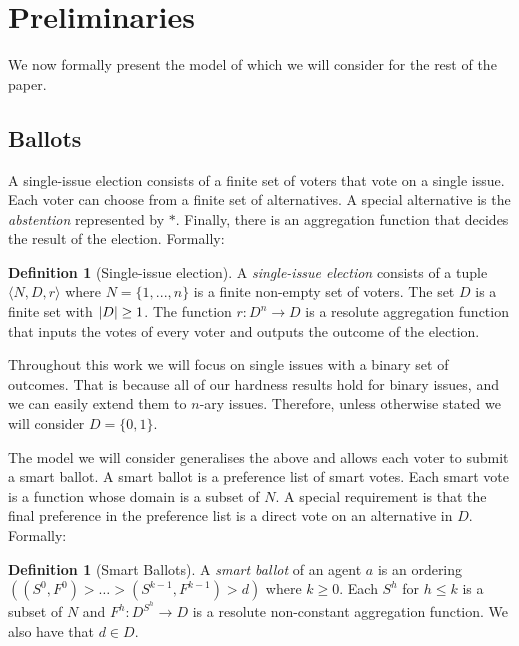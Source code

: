\documentclass[11pt,a4paper, titlepage]{article}
\DeclarePairedDelimiter\abs{\lvert}{\rvert}
\theoremstyle{definition}
\newtheorem{definition}[theorem]{Definition}
\begin{document}
\section{Preliminaries}

We now formally present the model of \citet{grandi} which we will consider for the rest of the paper.

\subsection{Ballots}

A single-issue election consists of a finite set of voters that vote on a single issue. 
Each voter can choose from a  finite set of alternatives. 
A special alternative is the \emph{abstention} represented by $*$. 
Finally, there is an aggregation function that decides the result of the election. 
Formally:

\begin{definition}[Single-issue election]
    A \emph{single-issue election} consists of a tuple $\langle N, D, r\rangle $ where $N = \{1,..., n\} $ is a finite non-empty set of voters. The set $D$ is a finite set with $\abs{D} \geq 1$. The function $r \colon D^n \longrightarrow D$ is a resolute aggregation function that inputs the votes of every voter and outputs the outcome of the election.
\end{definition}

Throughout this work we will focus on single issues with a binary set of outcomes. 
That is because all of our hardness results hold for binary issues, and we can easily extend them to $n$-ary issues. 
Therefore, unless otherwise stated we will consider $D = \{0, 1\}$.

The model we will consider generalises the above and allows each voter to submit a smart ballot. 
A smart ballot is a preference list of smart votes. 
Each smart vote is a function whose domain is a subset of $N$. 
A special requirement is that the final preference in the preference list is a direct vote on an alternative in $D$. 
Formally:

\begin{definition}[Smart Ballots]
    A \emph{smart ballot} of an agent $a$ is an ordering $( (S^0, F^0) > \ldots > (S^{k-1}, F^{k-1}) > d)$ where $k \geq 0$. Each $S^h$ for $h \leq k$ is a subset of $N$ and $F^h \colon D^{S^h} \longrightarrow D$ is a resolute non-constant aggregation function. We also have that $d \in D$.   
\end{definition}
\end{document}
